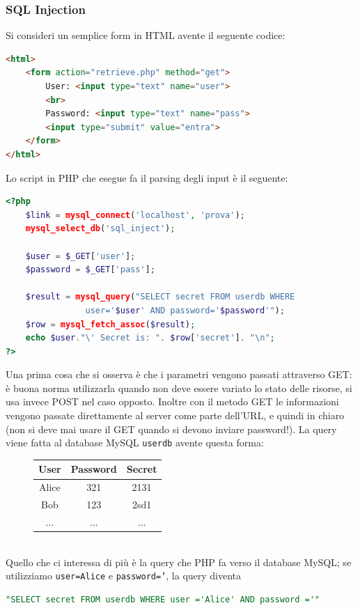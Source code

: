 \subsubsection{SQL Injection}
Si consideri un semplice form in HTML avente il seguente codice:
\begin{lstlisting}[language=html]
<html>
	<form action="retrieve.php" method="get">
		User: <input type="text" name="user">
		<br>
		Password: <input type="text" name="pass">
		<input type="submit" value="entra">
	</form>
</html>
\end{lstlisting}
Lo script in PHP che esegue fa il parsing degli input è il seguente:
\begin{lstlisting}[language=php]
<?php
	$link = mysql_connect('localhost', 'prova');
	mysql_select_db('sql_inject');
	
	$user = $_GET['user'];
	$password = $_GET['pass'];
	
	$result = mysql_query("SELECT secret FROM userdb WHERE
				user='$user' AND password='$password'");
	$row = mysql_fetch_assoc($result);
	echo $user."\' Secret is: ". $row['secret']. "\n";
?>
\end{lstlisting}
Una prima cosa che si osserva è che i parametri vengono passati attraverso GET: è buona norma utilizzarla quando non deve essere variato lo stato delle risorse, si usa invece POST nel caso opposto. Inoltre con il metodo GET le informazioni vengono passate direttamente al server come parte dell'URL, e quindi in chiaro (non si deve mai usare il GET quando si devono inviare password!). La query viene fatta al database MySQL \texttt{userdb} avente questa forma:
\begin{figure}[htbp]
	\centering
	\begin{tabular}{|c|c|c|}
		\hline
		\textbf{User} & \textbf{Password} & \textbf{Secret} \\
		\hline
		Alice & 321 & 2131 \\
		\hline
		Bob & 123 & 2sd1 \\
		\hline
		$\dots$ & $\dots$ & $\dots$ \\
		\hline
	\end{tabular}
\end{figure}\\
Quello che ci interessa di più è la query che PHP fa verso il database MySQL; se utilizziamo \texttt{user=Alice} e \texttt{password='}, la query diventa
\begin{lstlisting}[language=sql]
"SELECT secret FROM userdb WHERE user ='Alice' AND password ='"
\end{lstlisting}
